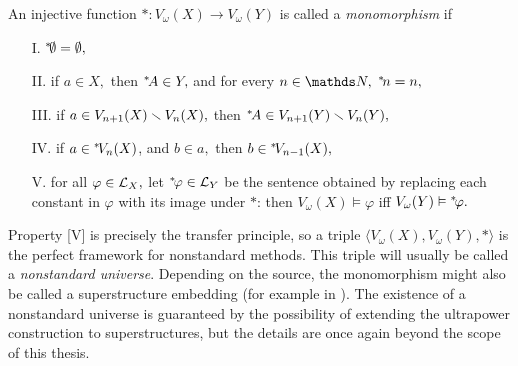 \documentclass[draft.tex]{subfiles}
\begin{document}
\begin{definition}
An injective function $\ast: V_{\omega}(X) \to V_{\omega}(Y)$ is called a \emph{monomorphism} if
\begin{itemize}
    \item[I.] ${{}^{*}\!{\emptyset}} = \emptyset,$
    \item[II.] if $a \in X,$ then ${{}^{*}\!{A}} \in Y,$ and for every $n \in \NN,$ ${{}^{*}\!{n}} = n,$ 
    \item[III.] if $a \in V_{n+1}(X) \smallsetminus V_{n}(X),$ then ${{}^{*}\!{A}} \in V_{n+1}(Y) \smallsetminus V_{n}(Y),$
    \item[IV.] if $a \in {{}^{*}\!{V_{n}(X)}}$, and $b \in a,$ then $b \in {{}^{*}\!{V_{n-1}(X)}},$
    \item[V.] for all $\varphi \in \mathcal{L}_X,$ let ${{}^{*}\!{\varphi}} \in \mathcal{L}_Y$ be the sentence obtained by replacing each constant in $\varphi$ with its image under $\ast$: then $V_{\omega}(X) \vDash \varphi$ iff $V_{\omega}(Y) \vDash {{}^{*}\!{\varphi}}.$
\end{itemize}
\end{definition}
Property [V] is precisely the transfer principle, so a triple $\langle V_{\omega}(X), V_{\omega}(Y), \ast \rangle$ is the perfect framework for nonstandard methods. This triple will usually be called a \emph{nonstandard universe}. Depending on the source, the monomorphism might also be called a superstructure embedding (for example in \cite{keisler}). The existence of a nonstandard universe is guaranteed by the possibility of extending the ultrapower construction to superstructures, but the details are once again beyond the scope of this thesis.
\end{document}
